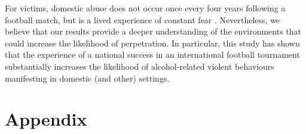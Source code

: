 \documentclass[12pt, a4paper]{article}
\begin{document}
For victims, domestic abuse does not occur once every four years following a football match, but is a lived experience of constant fear \cite{Brooks-Hay2018}. Nevertheless, we believe that our results provide a deeper understanding of the environments that could increase the likelihood of perpetration. In particular, this study has shown that the experience of a national success in an international football tournament substantially increases the likelihood of alcohol-related violent behaviours manifesting in domestic (and other) settings. 

\newpage




%
%
%

\clearpage

\newpage


\clearpage



\section*{Appendix}

\renewcommand{\thetable}{S\arabic{table}}
\renewcommand{\thefigure}{S\arabic{figure}}
\setcounter{table}{0}
\setcounter{figure}{0}
\end{document}
